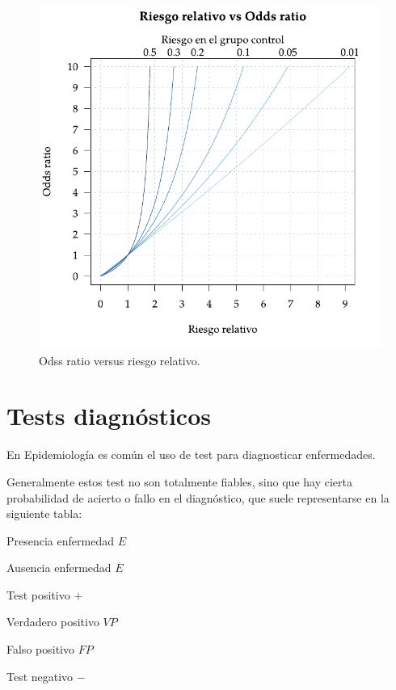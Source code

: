 \documentclass[
  a4paper,
]{scrreport}
\theoremstyle{plain}
\theoremstyle{definition}
\theoremstyle{definition}
\theoremstyle{remark}
\begin{document}
\begin{figure}[H]

{\centering \includegraphics{img/probabilidad/odds_ratio_vs_riesgo_relativo.pdf}

}

\caption{Odss ratio versus riesgo relativo.}

\end{figure}%

\section{Tests diagnósticos}\label{tests-diagnuxf3sticos}

En Epidemiología es común el uso de test para diagnosticar enfermedades.

Generalmente estos test no son totalmente fiables, sino que hay cierta
probabilidad de acierto o fallo en el diagnóstico, que suele
representarse en la siguiente tabla:

Presencia enfermedad \(E\)

Ausencia enfermedad \(\overline E\)

Test positivo \(+\)

{Verdadero positivo }\(VP\)

{Falso positivo }\(FP\)

Test negativo \(−\)
\end{document}
